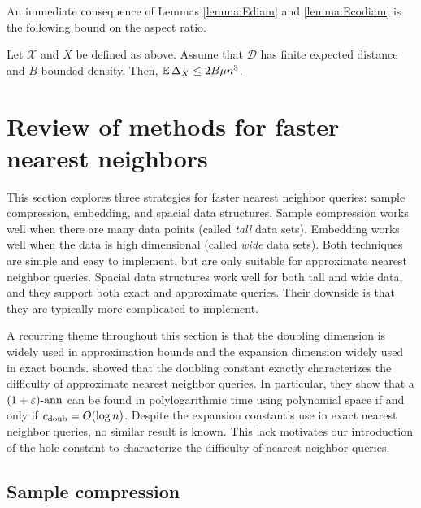 \documentclass[../main.tex]{subfiles}
\newcommand{\set}[1]{\mathcal {#1}}
\newcommand{\distribution}[1]{\mathcal {#1}}
\newcommand{\aspect}[1]{\Delta_{#1}}
\newcommand{\cdoub}{c_\textnormal{doub}}
\begin{document}

An immediate consequence of Lemmas \ref{lemma:Ediam} and \ref{lemma:Ecodiam} is the following bound on the aspect ratio.

\begin{lemma}
    \label{lemma:Easpect}
    Let $\set X$ and $X$ be defined as above.
    Assume that $\distribution D$ has finite expected distance and $B$-bounded density.
    Then, $\E\aspect{X} \le2B\mu n^3$. 
\end{lemma}


\section{Review of methods for faster nearest neighbors}

This section explores three strategies for faster nearest neighbor queries:
sample compression, embedding, and spacial data structures.
Sample compression works well when there are many data points
(called \emph{tall} data sets).
Embedding works well when the data is high dimensional
(called \emph{wide} data sets).
Both techniques are simple and easy to implement, 
but are only suitable for approximate nearest neighbor queries.
Spacial data structures work well for both tall and wide data,
and they support both exact and approximate queries.
Their downside is that they are typically more complicated to implement.

A recurring theme throughout this section is that the doubling dimension is widely used in approximation bounds and the expansion dimension widely used in exact bounds.
\cite{krauthgamer2005black} showed that the doubling constant exactly characterizes the difficulty of approximate nearest neighbor queries.
In particular, they show that a $(1+\varepsilon)\text{-ann}$ can be found in polylogarithmic time using polynomial space if and only if $\cdoub = O(\log n)$.
Despite the expansion constant's use in exact nearest neighbor queries,
no similar result is known.
This lack motivates our introduction of the hole constant to characterize the difficulty of nearest neighbor queries.


\subsection{Sample compression}
\end{document}
